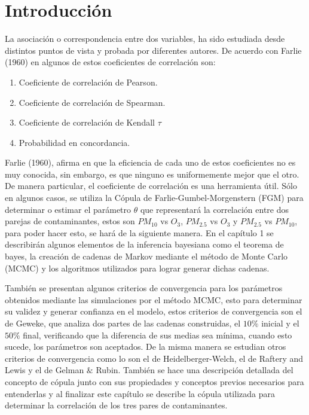 \chapter*{Introducción}


La asociación o correspondencia entre dos variables, ha sido estudiada desde distintos puntos de vista y probada por diferentes autores. De acuerdo con Farlie (1960) en \cite{farlie} algunos de estos coeficientes de correlación son: 

\begin{enumerate}
\item Coeficiente de correlación de Pearson.
\item Coeficiente de correlación de Spearman.
\item Coeficiente de correlación de Kendall $\tau$
\item Probabilidad en concordancia. 
\end{enumerate}

Farlie (1960), afirma en \cite{farlie} que la eficiencia de cada uno de estos coeficientes no es muy conocida, sin embargo, es que ninguno es uniformemente mejor que el otro. De manera particular, el coeficiente de correlación es una herramienta útil. Sólo en algunos casos, se utiliza la Cópula de Farlie-Gumbel-Morgenstern (FGM) para determinar o estimar el parámetro $\theta$ que representará la correlación entre dos parejas de contaminantes, estos son $PM_{10}$ vs $O_3$, $PM_{2.5}$ vs $O_3$ y $PM_{2.5}$ vs $PM_{10}$, para poder hacer esto, se hará de la siguiente manera. En el capítulo 1 se describirán algunos elementos de la inferencia bayesiana como el teorema de bayes, la creación de cadenas de Markov mediante el método de Monte Carlo (MCMC) y los algoritmos utilizados para lograr generar dichas cadenas. 

Tambi\'en se presentan algunos criterios de convergencia para los parámetros obtenidos mediante las simulaciones por el método MCMC, esto para determinar su validez y generar confianza en el modelo, estos criterios de convergencia son el de Geweke, que analiza dos partes de las cadenas construidas, el $10\%$ inicial y el $50\%$ final, verificando que la diferencia de sus medias sea mínima, cuando esto sucede, los parámetros son aceptados. De la misma manera se estudian otros criterios de convergencia como lo son el de Heidelberger-Welch, el de Raftery and Lewis y el de Gelman $\&$ Rubin. También se hace una descripción detallada del concepto de cópula junto con sus propiedades y conceptos previos necesarios para entenderlas y al finalizar este capítulo se describe la cópula utilizada para determinar la correlación de los tres pares de contaminantes. \\

